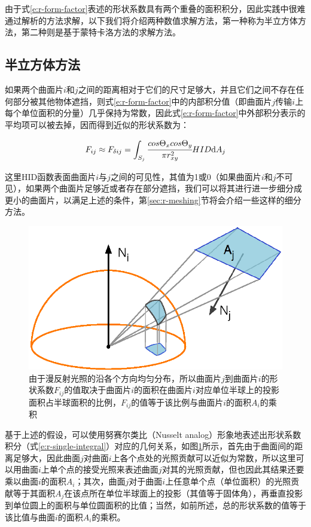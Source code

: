 由于式\ref{e:r-form-factor}表述的形状系数具有两个重叠的面积积分，因此实践中很难通过解析的方法求解，以下我们将介绍两种数值求解方法，第一种称为半立方体方法，第二种则是基于蒙特卡洛方法的求解方法。




\subsection{半立方体方法}\label{sec:the-hemi-cube}
如果两个曲面片$i$和$j$之间的距离相对于它们的尺寸足够大，并且它们之间不存在任何部分被其他物体遮挡，则式\ref{e:r-form-factor}中的内部积分值（即曲面片$j$传输$i$上每个单位面积的分量）几乎保持为常数，因此式\ref{e:r-form-factor}中外部积分表示的平均项可以被去掉，因而得到近似的形状系数为：

\begin{equation}\label{e:r-single-integral}
	F_{ij}\approx F_{\delta ij}=\int_{S_j} \cfrac{cos\Theta_x cos\Theta_y}{\pi r^{2}_{xy}} HID {\rm d}A_j
\end{equation}

\noindent 这里HID函数表面曲面片$i$与$j$之间的可见性，其值为1或0（如果曲面片$i$和$j$不可见），如果两个曲面片足够近或者存在部分遮挡，我们可以将其进行进一步细分成更小的曲面片，以满足上述的条件，第\ref{sec:r-meshing}节将会介绍一些这样的细分方法。

\begin{figure}
\sidecaption
	\includegraphics[width=.5\textwidth]{figures/r/nusselt-analog}
	\caption{由于漫反射光照的沿各个方向均匀分布，所以曲面片$j$到曲面片$i$的形状系数$F_{ij}$的值取决于曲面片$i$的面积在曲面片$i$对应单位半球上的投影面积占半球面积的比例，$F_{ij}$的值等于该比例与曲面片$i$的面积$A_i$的乘积}
	\label{f:r-nusselt-analog}
\end{figure}

基于上述的假设，可以使用努赛尔类比（Nusselt analog）形象地表述出形状系数积分（式\ref{e:r-single-integral}）对应的几何关系，如图\ref{f:r-nusselt-analog}所示，首先由于曲面间的距离足够大，因此曲面$j$对曲面$i$上各个点处的光照贡献可以近似为常数，所以这里可以用曲面$i$上单个点的接受光照来表述曲面$j$对其的光照贡献，但也因此其结果还要乘以曲面$i$的面积$A_i$；其次，曲面$j$对于曲面$i$上任意单个点（单位面积）的光照贡献等于其面积$A_j$在该点所在单位半球面上的投影（其值等于固体角），再垂直投影到单位圆上的面积与单位圆面积的比值；当然，如前所述，总的形状系数的值等于该比值与曲面$i$的面积$A_i$的乘积。

